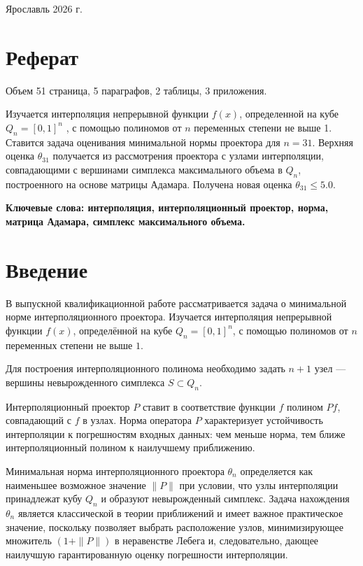 \documentclass[a4paper,12pt]{article}
\theoremstyle{indented}
\begin{document}
\vspace{0.5cm}
\begin{center}
Ярославль 2026 г.
\end{center}
\newpage

\section*{Реферат}

Объем 51 страница, 5 параграфов, 2 таблицы, 3 приложения.
\par
Изучается интерполяция непрерывной функции $f(x)$, определенной на кубе
$Q_n = [0, 1]^n$ , с помощью полиномов от $n$ переменных степени не выше 1. Ставится
задача оценивания минимальной нормы проектора для $n = 31$. Верхняя оценка $\theta_{31}$
получается из рассмотрения проектора с узлами интерполяции, совпадающими с
вершинами симплекса максимального объема в $Q_n$, построенного на основе матрицы Адамара. Получена новая оценка $\theta_{31} \leq 5.0$.
\par
\textbf{Ключевые слова: интерполяция, интерполяционный проектор, норма, матрица Адамара, симплекс максимального объема.}

\newpage

\pagestyle{plain}
\tableofcontents

\newpage

\section*{Введение}

В выпускной квалификационной работе рассматривается задача о минимальной норме интерполяционного проектора. Изучается интерполяция непрерывной функции $f(x)$, определённой на кубе $Q_n = [0,1]^n$, с помощью полиномов от $n$ переменных степени не выше $1$.
\par
Для построения интерполяционного полинома необходимо задать $n+1$ узел — вершины невырожденного симплекса $S \subset Q_n$.
\par
Интерполяционный проектор $P$ ставит в соответствие функции $f$ полином $P f$, совпадающий с $f$ в узлах. Норма оператора $P$ характеризует устойчивость интерполяции к погрешностям входных данных: чем меньше норма, тем ближе интерполяционный полином к наилучшему приближению.

Минимальная норма интерполяционного проектора $\theta_n$ определяется как наименьшее возможное значение $\|P\|$ при условии, что узлы интерполяции принадлежат кубу $Q_n$ и образуют невырожденный симплекс. Задача нахождения $\theta_n$ является классической в теории приближений и имеет важное практическое значение, поскольку позволяет выбрать расположение узлов, минимизирующее множитель $(1 + \|P\|)$ в неравенстве Лебега и, следовательно, дающее наилучшую гарантированную оценку погрешности интерполяции.
\end{document}
